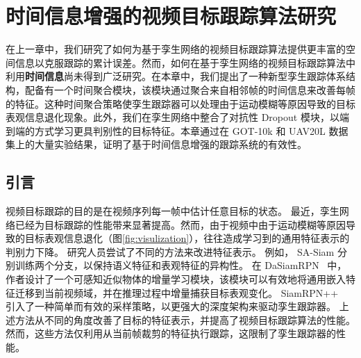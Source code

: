\chapter{时间信息增强的视频目标跟踪算法研究}\label{chap:end}
在上一章中，我们研究了如何为基于孪生网络的视频目标跟踪算法提供更丰富的空间信息以克服跟踪的累计误差。然而，如何在基于孪生网络的视频目标跟踪算法中利用\textbf{时间信息}尚未得到广泛研究。在本章中，我们提出了一种新型孪生跟踪体系结构，配备有一个时间聚合模块，该模块通过聚合来自相邻帧的时间信息来改善每帧的特征。这种时间聚合策略使孪生跟踪器可以处理由于运动模糊等原因导致的目标表观信息退化现象。此外，我们在孪生网络中整合了对抗性 Dropout 模块，以端到端的方式学习更具判别性的目标特征。本章通过在 GOT-10k \cite{GOT-10k} 和 UAV20L \cite{mueller2016benchmark} 数据集上的大量实验结果，证明了基于时间信息增强的跟踪系统的有效性。

\section{引言}
\label{sec:intro}
视频目标跟踪的目的是在视频序列每一帧中估计任意目标的状态。 
最近，孪生网络已经为目标跟踪的性能带来显著提高。然而，由于视频中由于运动模糊等原因导致的目标表观信息退化（图\ref{fig:visulization}），往往造成学习到的通用特征表示的判别力下降。
研究人员尝试了不同的方法来改进特征表示。
例如，
SA-Siam \cite{he2018twofold} 分别训练两个分支，以保持语义特征和表观特征的异构性。
在 DaSiamRPN~\cite{zhu2018distractor} 中，作者设计了一个可感知近似物体的增量学习模块，该模块可以有效地将通用嵌入特征迁移到当前视频域，并在推理过程中增量捕获目标表观变化。
SiamRPN++~\cite{SiamRPN++} 引入了一种简单而有效的采样策略，以更强大的深度架构来驱动孪生跟踪器。
上述方法从不同的角度改善了目标的特征表示，并提高了视频目标跟踪算法的性能。
然而，这些方法仅利用从当前帧裁剪的特征执行跟踪，这限制了孪生跟踪器的性能。

